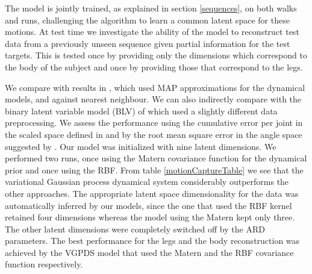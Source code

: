 \documentclass{article} %
\begin{document}
The model is jointly trained, as explained in section \ref{sequences},
on both walks and runs, challenging the algorithm to learn a common latent
space for these motions. At test time we investigate the ability of
the model to reconstruct test data from a previously unseen sequence
given partial information for the test targets. This is tested once by
providing only the dimensions which correspond to the body of the
subject and once by providing those that correspond to the legs.
%
%

We compare with results in \cite{gplvmLarger}, which used MAP
approximations for the dynamical models, and against nearest
neighbour. We can also indirectly compare with the binary latent
variable model (BLV) of \cite{Taylor} which used a slightly different
data preprocessing. We assess the performance using the cumulative
error per joint in the scaled space defined in \cite{Taylor} and by
the root mean square error in the angle space suggested by
\cite{gplvmLarger}. Our model was initialized with nine latent
dimensions. We performed two runs, once using the Matern covariance function for the dynamical prior
and once using the RBF. From table
\ref{motionCaptureTable} we see that the variational Gaussian process
dynamical system considerably outperforms the other approaches. 
%
The appropriate latent space dimensionality for the data was automatically
inferred by our models, since the one that used the RBF kernel retained four dimensions 
whereas the model using the Matern kept only three.
%
%
The
other latent dimensions were completely switched off by the ARD
parameters. 
The best performance for the legs and the body reconstruction was achieved by the VGPDS model that used the Matern and the RBF covariance function respectively.


\end{document}
